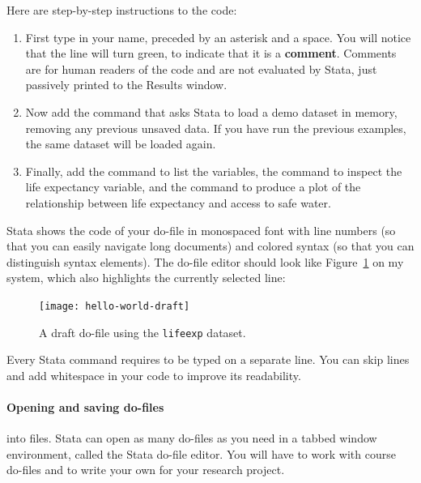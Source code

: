Here are step-by-step instructions to the code:

\begin{enumerate}
	\item First type in your name, preceded by an asterisk and a space. You will notice that the line will turn green, to indicate that it is a \textbf{comment}. Comments are for human readers of the code and are not evaluated by Stata, just passively printed to the Results window.%
	
	\item Now add the  command that asks Stata to load a demo dataset in memory, removing any previous unsaved data. If you have run the previous examples, the same dataset will be loaded again.%
	
	\item Finally, add the  command to list the variables, the  command to inspect the life expectancy variable, and the  command to produce a plot of the relationship between life expectancy and access to safe water.%
\end{enumerate}

Stata shows the code of your do-file in monospaced font with line numbers (so that you can easily navigate long documents) and colored syntax (so that you can distinguish syntax elements). The do-file editor should look like Figure~\ref{fig:hello-world-draft} on my system, which also highlights the currently selected line:%

\begin{figure}%
	\texttt{[image: hello-world-draft]}%
	\caption{A draft do-file using the \texttt{lifeexp} dataset.}%
	\label{fig:hello-world-draft}%
\end{figure}

Every Stata command requires to be typed on a separate line. You can skip lines and add whitespace in your code to improve its readability.%

\paragraph{Opening and saving do-files}

 into  files. Stata can open as many do-files as you need in a tabbed window environment, called the Stata do-file editor. You will have to work with course do-files and to write your own for your research project.%

